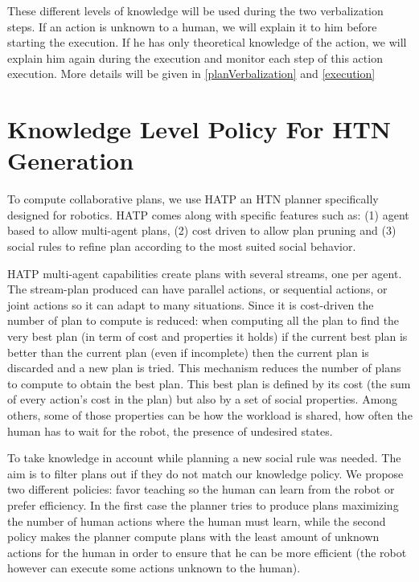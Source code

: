\documentclass{llncs}
\begin{document}
These different levels of knowledge will be used during the two verbalization steps. If an action is unknown to a human, we will explain it to him before starting the execution. If he has only theoretical knowledge of the action, we will explain him again during the execution and monitor each step of this action execution. More details will be given in \ref{planVerbalization} and \ref{execution}



\section{Knowledge Level Policy For HTN Generation}
\label{planning}
To compute collaborative plans, we use HATP \cite{lallement14} an HTN planner specifically designed for robotics. 
HATP comes along with specific features such as: (1) agent based to allow multi-agent plans, (2) cost driven to allow plan pruning and (3) social rules to refine plan according to the most suited social behavior.

HATP multi-agent capabilities create plans with several streams, one per agent. The stream-plan produced can have parallel actions, or sequential actions, or joint actions so it can adapt to many situations. Since it is cost-driven the number of plan to compute is reduced: when computing all the plan to find the very best plan (in term of cost and properties it holds) if the current best plan is better than the current plan (even if incomplete) then the current plan is discarded and a new plan is tried. This mechanism reduces the number of plans to compute to obtain the best plan. This best plan is defined by its cost (the sum of every action's cost in the plan) but also by a set of social properties. Among others, some of those properties can be how the workload is shared, how often the human has to wait for the robot, the presence of undesired states.

To take knowledge in account while planning a new social rule was needed. The aim is to filter plans out if they do not match our knowledge policy. We propose two different policies: favor teaching so the human can learn from the robot or prefer efficiency. In the first case the planner tries to produce plans maximizing the number of human actions where the human must learn, while the second policy makes the planner 
compute plans with the least amount of unknown actions for the human in order to ensure that he can be more efficient (the robot however can execute some actions unknown to the human).
\end{document}
